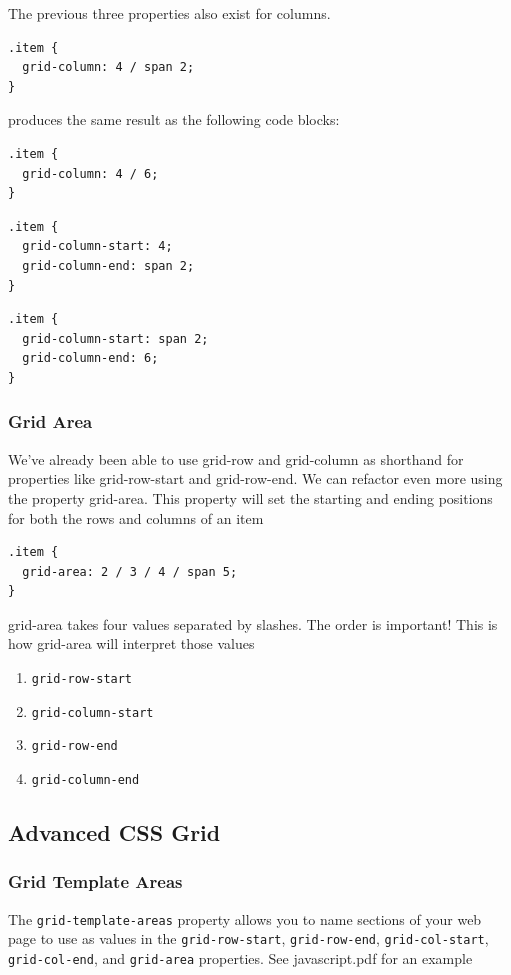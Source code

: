 \documentclass[a4paper, 12pt]{article}
\begin{document}
The previous three properties also exist for columns.
\begin{verbatim}
.item {
  grid-column: 4 / span 2;
}
\end{verbatim}
produces the same result as the following code blocks:
\begin{verbatim}
.item {
  grid-column: 4 / 6;
}
\end{verbatim}

\begin{verbatim}
.item {
  grid-column-start: 4;
  grid-column-end: span 2;
}
\end{verbatim}

\begin{verbatim}
.item {
  grid-column-start: span 2;
  grid-column-end: 6;
}
\end{verbatim}

\subsubsection{Grid Area}
We've already been able to use grid-row and grid-column as shorthand for properties like grid-row-start and grid-row-end. We can refactor even more using the property grid-area. This property will set the starting and ending positions for both the rows and columns of an item
\begin{verbatim}
.item {
  grid-area: 2 / 3 / 4 / span 5;
}
\end{verbatim}
grid-area takes four values separated by slashes. The order is important! This is how grid-area will interpret those values
\begin{enumerate}
\item \verb|grid-row-start|
\item \verb|grid-column-start|
\item \verb|grid-row-end|
\item \verb|grid-column-end|
\end{enumerate}

\subsection{Advanced CSS Grid}
\subsubsection{Grid Template Areas}
The \verb|grid-template-areas| property allows you to name sections of your web page to use as values in the \verb|grid-row-start|, \verb|grid-row-end|, \verb|grid-col-start|, \verb|grid-col-end|, and \verb|grid-area| properties. See javascript.pdf for an example
\end{document}
